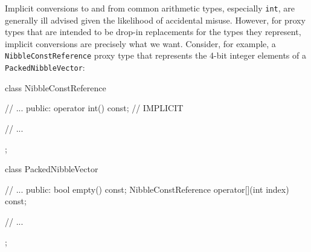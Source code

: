 Implicit conversions to and from common arithmetic types, especially
\lstinline!int!, are generally ill advised given the likelihood of
accidental misuse. 
%
However, for proxy types that are intended to be drop-in replacements for the types they represent, implicit conversions are precisely what we want. Consider, for example, a \lstinline!NibbleConstReference!
 proxy type that represents the 4-bit integer elements of a \lstinline!PackedNibbleVector!:


\begin{emcppslisting}[emcppsbatch=e3]
class NibbleConstReference
{
    // ...
public:
    operator int() const; // IMPLICIT

    // ...
};

class PackedNibbleVector 
{
    // ...
public:
    bool empty() const;
    NibbleConstReference operator[](int index) const;
    
    // ...
};
\end{emcppslisting}

